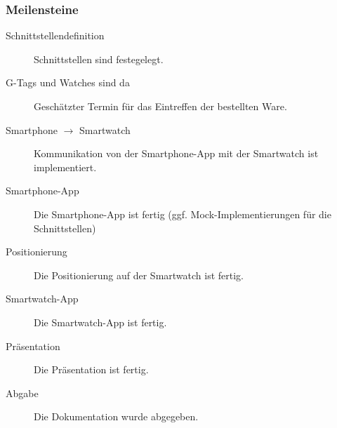 \subsubsection{Meilensteine}
\begin{description}
	\item[Schnittstellendefinition] Schnittstellen sind festegelegt.
	\item[G-Tags und Watches sind da] Geschätzter Termin für das Eintreffen der bestellten Ware.
	\item[Smartphone $\rightarrow$ Smartwatch] Kommunikation von der Smartphone-App mit der Smartwatch ist implementiert.
	\item[Smartphone-App] Die Smartphone-App ist fertig (ggf. Mock-Implementierungen für die Schnittstellen)
	\item[Positionierung] Die Positionierung auf der Smartwatch ist fertig.
	\item[Smartwatch-App] Die Smartwatch-App ist fertig.
	\item[Präsentation] Die Präsentation ist fertig.
	\item[Abgabe] Die Dokumentation wurde abgegeben.
\end{description}



